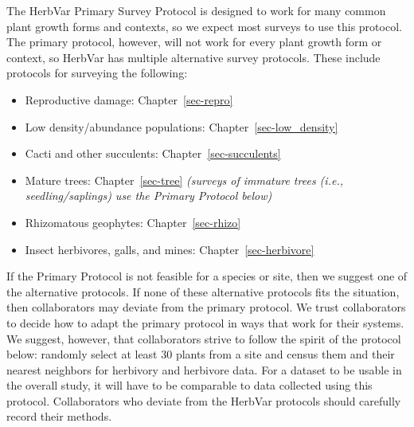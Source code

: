 \documentclass[
  letterpaper,
  oneside,
  open=any]{scrbook}
\providecommand{\tightlist}{%
  \setlength{\itemsep}{0pt}\setlength{\parskip}{0pt}}\usepackage{longtable,booktabs,array}
\begin{document}
\begin{tcolorbox}[enhanced jigsaw, rightrule=.15mm, title=\textcolor{quarto-callout-important-color}{\faExclamation}\hspace{0.5em}{Alternatives to the Primary Protocol}, colbacktitle=quarto-callout-important-color!10!white, coltitle=black, bottomtitle=1mm, breakable, colback=white, leftrule=.75mm, arc=.35mm, toprule=.15mm, colframe=quarto-callout-important-color-frame, opacityback=0, left=2mm, toptitle=1mm, titlerule=0mm, bottomrule=.15mm, opacitybacktitle=0.6]

The HerbVar Primary Survey Protocol is designed to work for many common
plant growth forms and contexts, so we expect most surveys to use this
protocol. The primary protocol, however, will not work for every plant
growth form or context, so HerbVar has multiple alternative survey
protocols. These include protocols for surveying the following:

\begin{itemize}
\tightlist
\item
  Reproductive damage: Chapter~\ref{sec-repro}
\item
  Low density/abundance populations: Chapter~\ref{sec-low_density}
\item
  Cacti and other succulents: Chapter~\ref{sec-succulents}
\item
  Mature trees: Chapter~\ref{sec-tree} \emph{(surveys of immature trees
  (i.e., seedling/saplings) use the Primary Protocol below)}
\item
  Rhizomatous geophytes: Chapter~\ref{sec-rhizo}
\item
  Insect herbivores, galls, and mines: Chapter~\ref{sec-herbivore}
\end{itemize}

\end{tcolorbox}

If the Primary Protocol is not feasible for a species or site, then we
suggest one of the alternative protocols. If none of these alternative
protocols fits the situation, then collaborators may deviate from the
primary protocol. We trust collaborators to decide how to adapt the
primary protocol in ways that work for their systems. We suggest,
however, that collaborators strive to follow the spirit of the protocol
below: randomly select at least 30 plants from a site and census them
and their nearest neighbors for herbivory and herbivore data. For a
dataset to be usable in the overall study, it will have to be comparable
to data collected using this protocol. Collaborators who deviate from
the HerbVar protocols should carefully record their methods.
\end{document}
